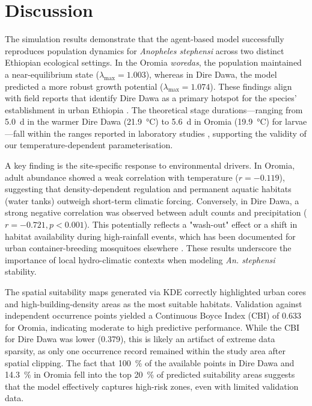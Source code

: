 \documentclass{article}
\begin{document}
\section{Discussion}
\label{sec:discussion}
\par
The simulation results demonstrate that the agent-based model successfully reproduces population dynamics for \textit{Anopheles stephensi} 
across two distinct Ethiopian ecological settings. In the Oromia \textit{woredas}, the population maintained a near-equilibrium state 
($\lambda_{\max} = 1.003$), whereas in Dire Dawa, the model predicted a more robust growth potential ($\lambda_{\max} = 1.074$). These 
findings align with field reports that identify Dire Dawa as a primary hotspot for the species' establishment in urban Ethiopia \citep{2021.MB.AUO}. 
The theoretical stage durations—ranging from \SI{5.0}{\day} in the warmer Dire Dawa (\SI{21.9}{\celsius}) to \SI{5.6}{\day} in Oromia 
(\SI{19.9}{\celsius}) for larvae—fall within the ranges reported in laboratory studies \citep{2023.JJ.BBA}, supporting the validity of our 
temperature-dependent parameterisation.
\par
A key finding is the site-specific response to environmental drivers. In Oromia, adult abundance showed a weak correlation with temperature 
($r = -0.119$), suggesting that density-dependent regulation and permanent aquatic habitats (water tanks) outweigh short-term climatic forcing. 
Conversely, in Dire Dawa, a strong negative correlation was observed between adult counts and precipitation ($r = -0.721, p < 0.001$). This 
potentially reflects a "wash-out" effect or a shift in habitat availability during high-rainfall events, which has been documented for urban 
container-breeding mosquitoes elsewhere \citep{2016.ST.OTI}. These results underscore the importance of local hydro-climatic contexts when 
modeling \textit{An. stephensi} stability.
\par
The spatial suitability maps generated via KDE correctly highlighted urban cores and high-building-density areas as the most suitable habitats. 
Validation against independent occurrence points yielded a Continuous Boyce Index (CBI) of \num{0.633} for Oromia, indicating moderate to high 
predictive performance. While the CBI for Dire Dawa was lower (\num{0.379}), this is likely an artifact of extreme data sparsity, as only one 
occurrence record remained within the study area after spatial clipping. The fact that \SI{100}{\percent} of the available points in Dire Dawa 
and \SI{14.3}{\percent} in Oromia fell into the top \SI{20}{\percent} of predicted suitability areas suggests that the model effectively 
captures high-risk zones, even with limited validation data.
\end{document}
